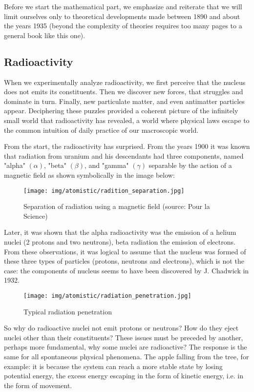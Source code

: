 	Before we start the mathematical part, we emphasize and reiterate that we will limit ourselves only to theoretical developments made between 1890 and about the years 1935 (beyond the complexity of theories requires too many pages to a general book like this one).
	
	\pagebreak
	\subsection{Radioactivity}
	When we experimentally analyze radioactivity, we first perceive that the nucleus does not emits its constituents. Then we discover new forces, that struggles and dominate in turn. Finally, new particulate matter, and even antimatter particles appear. Deciphering these puzzles provided a coherent picture of the infinitely small world that radioactivity has revealed, a world where physical laws escape to the common intuition of daily practice of our macroscopic world.
	
	From the start, the radioactivity has surprised. From the years 1900 it was known that radiation from uranium and his descendants had three components, named "alpha" $(\alpha)$, "beta" $(\beta)$, and "gamma" $(\gamma)$ separable by the action of a magnetic field as shown symbolically in the image below:
	\begin{figure}[H]
		\begin{center}
		\texttt{[image: img/atomistic/radition\_separation.jpg]}
		\end{center}	
		\caption{Separation of radiation using a magnetic field (source: Pour la Science)}
	\end{figure}
	Later, it was shown that the alpha radioactivity was the emission of a helium nuclei (2 protons and two neutrons), beta radiation the emission of electrons. From these observations, it was logical to assume that the nucleus was formed of these three types of particles (protons, neutrons and electrons), which is not the case: the  components of nucleus seems to have been discovered by J. Chadwick in 1932.
	\begin{figure}[H]
		\begin{center}
		\texttt{[image: img/atomistic/radiation\_penetration.jpg]}
		\end{center}	
		\caption{Typical radiation penetration}
	\end{figure}
	
	So why do radioactive nuclei not emit protons or neutrons? How do they eject nuclei other than their constituents? These issues must be preceded by another, perhaps more fundamental, why some nuclei are radioactive? The response is the same for all spontaneous physical phenomena. The apple falling from the tree, for example: it is because the system can reach a more stable state by losing potential energy, the excess energy escaping in the form of kinetic energy, i.e. in the form of movement.
	
